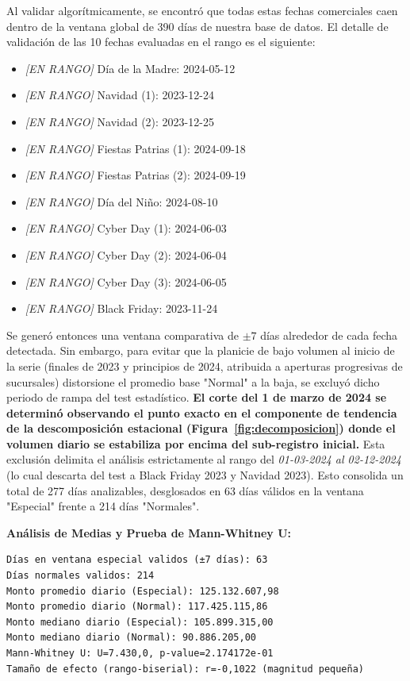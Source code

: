 \documentclass[12pt,letterpaper]{article}
\begin{document}
Al validar algorítmicamente, se encontró que todas estas fechas comerciales caen dentro de la ventana global de 390 días de nuestra base de datos. El detalle de validación de las 10 fechas evaluadas en el rango es el siguiente:
\begin{itemize}
    \item \textit{[EN RANGO]} Día de la Madre: 2024-05-12
    \item \textit{[EN RANGO]} Navidad (1): 2023-12-24
    \item \textit{[EN RANGO]} Navidad (2): 2023-12-25
    \item \textit{[EN RANGO]} Fiestas Patrias (1): 2024-09-18
    \item \textit{[EN RANGO]} Fiestas Patrias (2): 2024-09-19
    \item \textit{[EN RANGO]} Día del Niño: 2024-08-10
    \item \textit{[EN RANGO]} Cyber Day (1): 2024-06-03
    \item \textit{[EN RANGO]} Cyber Day (2): 2024-06-04
    \item \textit{[EN RANGO]} Cyber Day (3): 2024-06-05
    \item \textit{[EN RANGO]} Black Friday: 2023-11-24
\end{itemize}

Se generó entonces una ventana comparativa de $\pm 7$ días alrededor de cada fecha detectada. Sin embargo, para evitar que la planicie de bajo volumen al inicio de la serie (finales de 2023 y principios de 2024, atribuida a aperturas progresivas de sucursales) distorsione el promedio base "Normal" a la baja, se excluyó dicho periodo de rampa del test estadístico. \textbf{El corte del 1 de marzo de 2024 se determinó observando el punto exacto en el componente de tendencia de la descomposición estacional (Figura~\ref{fig:decomposicion}) donde el volumen diario se estabiliza por encima del sub-registro inicial.} Esta exclusión delimita el análisis estrictamente al rango del \textit{01-03-2024 al 02-12-2024} (lo cual descarta del test a Black Friday 2023 y Navidad 2023). Esto consolida un total de 277 días analizables, desglosados en 63 días válidos en la ventana "Especial" frente a 214 días "Normales".

\vspace{0.4cm}
\noindent\textbf{Análisis de Medias y Prueba de Mann-Whitney U:}
\begin{verbatim}
Días en ventana especial validos (±7 días): 63
Días normales validos: 214
Monto promedio diario (Especial): 125.132.607,98
Monto promedio diario (Normal): 117.425.115,86
Monto mediano diario (Especial): 105.899.315,00
Monto mediano diario (Normal): 90.886.205,00
Mann-Whitney U: U=7.430,0, p-value=2.174172e-01
Tamaño de efecto (rango-biserial): r=-0,1022 (magnitud pequeña)
\end{verbatim}
\vspace{0.4cm}
\end{document}
